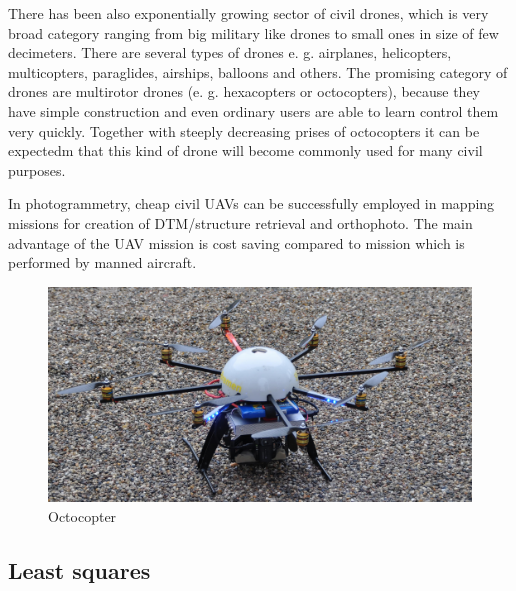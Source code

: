 \documentclass[a4paper,12pt]{article}
\begin{document}

There has been also exponentially growing sector of civil drones, which is very broad category ranging
from big military like drones to small ones in size of few decimeters. There are several types of drones e. g. airplanes,
helicopters, multicopters, paraglides, airships, balloons and others. 
The promising category of drones are multirotor drones (e. g. hexacopters or octocopters), because they have simple construction and 
even ordinary users are able to learn control them very quickly. Together with steeply decreasing prises of octocopters it can be expectedm 
that this kind of drone will become commonly used for many civil purposes.

In photogrammetry, cheap civil UAVs can be successfully employed in mapping missions for creation of DTM/structure retrieval and orthophoto.
The main advantage of the UAV mission is cost saving compared to mission which is performed by manned aircraft.

\begin{figure}[h]
    \centering
    \includegraphics[scale=0.8]{figures/octocopter.jpg}
    \caption{Octocopter \cite{boe2013octocopter}}
    \label{fig:sample_figure}
\end{figure}


\subsection{Least squares}
\label{sec:least}

\end{document}
